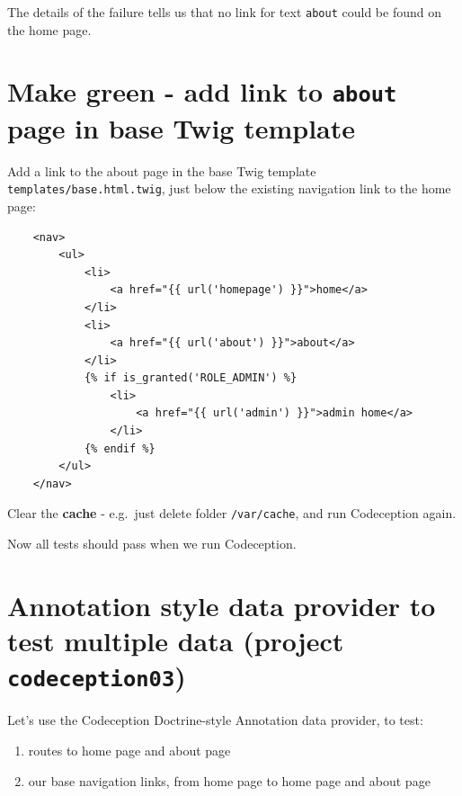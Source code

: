 \documentclass[a4paperpaper,openright]{book}
\begin{document}
The details of the failure tells us that no link for text \texttt{about}
could be found on the home page.

\hypertarget{make-green---add-link-to-about-page-in-base-twig-template}{%
\section{\texorpdfstring{Make green - add link to \texttt{about} page in
base Twig
template}{Make green - add link to about page in base Twig template}}\label{make-green---add-link-to-about-page-in-base-twig-template}}

Add a link to the about page in the base Twig template
\texttt{templates/base.html.twig}, just below the existing navigation
link to the home page:

\begin{verbatim}
    <nav>
        <ul>
            <li>
                <a href="{{ url('homepage') }}">home</a>
            </li>
            <li>
                <a href="{{ url('about') }}">about</a>
            </li>
            {% if is_granted('ROLE_ADMIN') %}
                <li>
                    <a href="{{ url('admin') }}">admin home</a>
                </li>
            {% endif %}
        </ul>
    </nav>
\end{verbatim}

Clear the \textbf{cache} - e.g.~just delete folder \texttt{/var/cache},
and run Codeception again.

Now all tests should pass when we run Codeception.

\hypertarget{annotation-style-data-provider-to-test-multiple-data-project-codeception03}{%
\section{\texorpdfstring{Annotation style data provider to test multiple
data (project
\texttt{codeception03})}{Annotation style data provider to test multiple data (project codeception03)}}\label{annotation-style-data-provider-to-test-multiple-data-project-codeception03}}

Let's use the Codeception Doctrine-style Annotation data provider, to
test:

\begin{enumerate}
\def\labelenumi{\arabic{enumi}.}
\item
  routes to home page and about page
\item
  our base navigation links, from home page to home page and about page
\end{enumerate}
\end{document}

